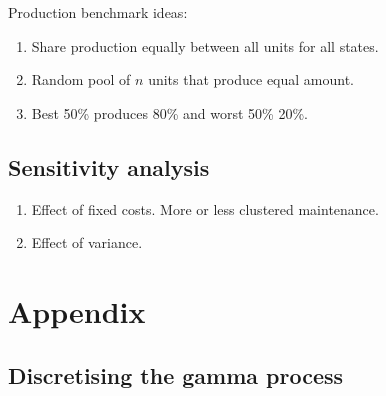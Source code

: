 \documentclass[a4paper,12pt]{article}
\begin{document}
Production benchmark ideas:
\begin{enumerate}
	\item Share production equally between all units for all states.
	\item Random pool of $n$ units that produce equal amount.
	\item Best 50\% produces 80\% and worst 50\% 20\%.
\end{enumerate}

\subsection{Sensitivity analysis}
\begin{enumerate}
	\item Effect of fixed costs. More or less clustered maintenance.
	\item Effect of variance.
	
\end{enumerate}

\appendix

\section{Appendix}

\subsection{Discretising the gamma process}
\end{document}
